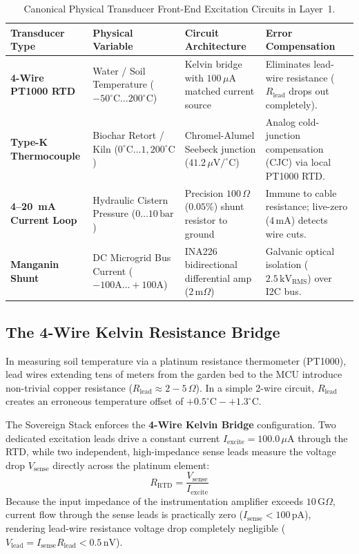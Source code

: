 \begin{table}[htbp]
\centering
\small
\begin{tabular}{|p{}|p{}|p{}|p{}|}
\hline
\textbf{Transducer Type} & \textbf{Physical Variable} & \textbf{Circuit Architecture} & \textbf{Error Compensation} \\
\hline
\textbf{4-Wire PT1000 RTD} & Water / Soil Temperature ($-50^\circ\mathrm{C} \dots 200^\circ\mathrm{C}$) & Kelvin bridge with $100\,\mu\mathrm{A}$ matched current source & Eliminates lead-wire resistance ($R_{\mathrm{lead}}$ drops out completely). \\
\hline
\textbf{Type-K Thermocouple} & Biochar Retort / Kiln ($0^\circ\mathrm{C} \dots 1{,}200^\circ\mathrm{C}$) & Chromel-Alumel Seebeck junction ($41.2\,\mu\mathrm{V}/^\circ\mathrm{C}$) & Analog cold-junction compensation (CJC) via local PT1000 RTD. \\
\hline
\textbf{4--20~mA Current Loop} & Hydraulic Cistern Pressure ($0 \dots 10\,\mathrm{bar}$) & Precision $100\,\Omega$ ($0.05\%$) shunt resistor to ground & Immune to cable resistance; live-zero ($4\,\mathrm{mA}$) detects wire cuts. \\
\hline
\textbf{Manganin Shunt} & DC Microgrid Bus Current ($-100\mathrm{A} \dots +100\mathrm{A}$) & INA226 bidirectional differential amp ($2\,\mathrm{m}\Omega$) & Galvanic optical isolation ($2.5\,\mathrm{kV}_{\mathrm{RMS}}$) over I2C bus. \\
\hline
\end{tabular}
\caption{Canonical Physical Transducer Front-End Excitation Circuits in Layer~1.}
\label{tab:transducer_frontends}
\end{table}

\subsection{The 4-Wire Kelvin Resistance Bridge}
In measuring soil temperature via a platinum resistance thermometer (PT1000), lead wires extending tens of meters from the garden bed to the MCU introduce non-trivial copper resistance ($R_{\mathrm{lead}} \approx 2 - 5\,\Omega$). In a simple 2-wire circuit, $R_{\mathrm{lead}}$ creates an erroneous temperature offset of $+0.5^\circ\mathrm{C} - +1.3^\circ\mathrm{C}$.

The Sovereign Stack enforces the \textbf{4-Wire Kelvin Bridge} configuration. Two dedicated excitation leads drive a constant current $I_{\mathrm{excite}} = 100.0\,\mu\mathrm{A}$ through the RTD, while two independent, high-impedance sense leads measure the voltage drop $V_{\mathrm{sense}}$ directly across the platinum element:
\begin{equation}
R_{\mathrm{RTD}} = \frac{V_{\mathrm{sense}}}{I_{\mathrm{excite}}}
\label{eq:kelvin_resistance}
\end{equation}
Because the input impedance of the instrumentation amplifier exceeds $10\,\mathrm{G}\Omega$, current flow through the sense leads is practically zero ($I_{\mathrm{sense}} < 100\,\mathrm{pA}$), rendering lead-wire resistance voltage drop completely negligible ($V_{\mathrm{lead}} = I_{\mathrm{sense}} R_{\mathrm{lead}} < 0.5\,\mathrm{nV}$).

